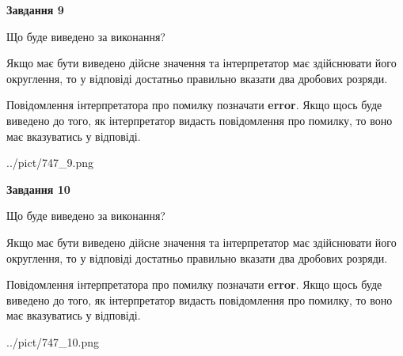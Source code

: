 \documentclass[12pt, ukrainian]{article}
\begin{document}
{\begin {Large}
{\begin {center}\textbf{Завдання 9}\end {center}}\par
Що буде виведено за виконання? \par

Якщо має бути виведено дійсне значення та інтерпретатор має здійснювати його округлення, 
то у відповіді достатньо правильно вказати два дробових розряди.

Повідомлення інтерпретатора про помилку позначати \textbf{error}.
Якщо щось буде виведено до того, як інтерпретатор видасть повідомлення про помилку, 
то воно має вказуватись у відповіді. \par

\begin{center}
	{../pict/747_9.png}
\end{center}
\newpage

{\begin {center}\textbf{Завдання 10}\end {center}}\par
Що буде виведено за виконання? \par

Якщо має бути виведено дійсне значення та інтерпретатор має здійснювати його округлення, 
то у відповіді достатньо правильно вказати два дробових розряди.

Повідомлення інтерпретатора про помилку позначати \textbf{error}.
Якщо щось буде виведено до того, як інтерпретатор видасть повідомлення про помилку, 
то воно має вказуватись у відповіді. \par

\begin{center}
	{../pict/747_10.png}
\end{center}
\newpage

\end {Large}}
\end{document}
